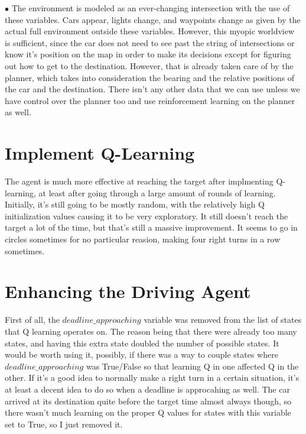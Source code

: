 \documentclass{amsart}
\begin{document}
\begin{list}{$\bullet$}{\addtolength{\parsep}{1mm}}
The environment is modeled as an ever-changing intersection with the use of these variables.  Cars appear, lights change, and waypoints change as given by the actual full environment outside these variables.  However, this myopic worldview is sufficient, since the car does not need to see past the string of intersections or know it's position on the map in order to make its decisions except for figuring out how to get to the destination.  However, that is already taken care of by the planner, which takes into consideration the bearing and the relative positions of the car and the destination.  There isn't any other data that we can use unless we have control over the planner too and use reinforcement learning on the planner as well.
\end{list}
\section{Implement Q-Learning}
The agent is much more effective at reaching the target after implmenting Q-learning, at least after going through a large amount of rounds of learning.  Initially, it's still going to be mostly random, with the relatively high Q initialization values causing it to be very exploratory.  It still doesn't reach the target a lot of the time, but that's still a massive improvement.    It seems to go in circles sometimes for no particular reasion, making four right turns in a row sometimes.  
\section{Enhancing the Driving Agent}
First of all, the $deadline\_approaching$ variable was removed from the list of states that Q learning operates on.  The reason being that there were already too many states, and having this extra state doubled the number of possible states.  It would be worth using it, possibly, if there was a way to couple states where $deadline\_approaching$ was True/False so that learning Q in one affected Q in the other.  If it's a good idea to normally make a right turn in a certain situation, it's at least a decent idea to do so when a deadline is approcahing as well.  The car arrived at its destination quite before the target time almost always though, so there wasn't much learning on the proper Q values for states with this variable set to True, so I just removed it.
\end{document}
